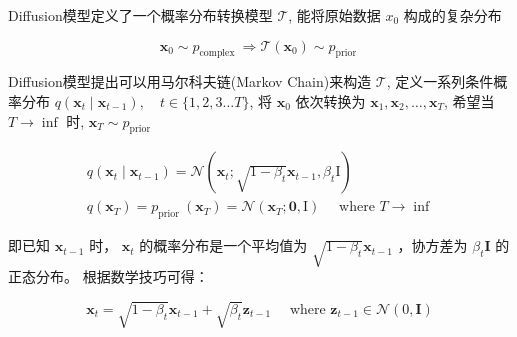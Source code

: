 \documentclass[]{ctexart}
\begin{document}
Diffusion模型定义了一个概率分布转换模型 $\mathcal{T}$, 能将原始数据 $x_0$ 构成的复杂分布

$$
\mathbf{x}_0 \sim p_{\text {complex }} \Longrightarrow \mathcal{T}\left(\mathbf{x}_0\right) \sim p_{\text {prior }}
$$

Diffusion模型提出可以用马尔科夫链(Markov Chain)来构造 $\mathcal{T}$, 定义一系列条件概率分布 $q\left(\mathbf{x}_t \mid \mathbf{x}_{t-1}\right), \quad t \in\{1,2,3 \ldots T\}$, 
将 $\mathbf{x}_0$ 依次转换为 $\mathbf{x}_1, \mathbf{x}_2, \ldots, \mathbf{x}_T$, 希望当 $T \rightarrow \inf$ 时, $\mathbf{x}_T \sim p_{\text {prior }}$

$$
\begin{gathered}
q\left(\mathbf{x}_t \mid \mathbf{x}_{t-1}\right)=\mathcal{N}\left(\mathbf{x}_t ; \sqrt{1-\beta_t} \mathbf{x}_{t-1}, \beta_t \mathrm{I}\right) \\
q\left(\mathbf{x}_T\right)=p_{\text {prior }}\left(\mathbf{x}_T\right)=\mathcal{N}\left(\mathbf{x}_T ; \mathbf{0}, \mathrm{I}\right) \quad \text { where } T \rightarrow \inf
\end{gathered}
$$

即已知 $\mathbf{x}_{t-1}$ 时， $\mathbf{x}_t$ 的概率分布是一个平均值为 $\sqrt{1-\beta_t} \mathbf{x}_{t-1}$ ，协方差为 $\beta_t \mathbf{I}$ 的正态分布。
根据数学技巧可得：

$$
\mathbf{x}_t=\sqrt{1-\beta_t} \mathbf{x}_{t-1}+\sqrt{\beta_t} \mathbf{z}_{t-1} \quad \text { where } \mathbf{z}_{t-1} \in \mathcal{N}(0, \mathbf{I})
$$
\end{document}
